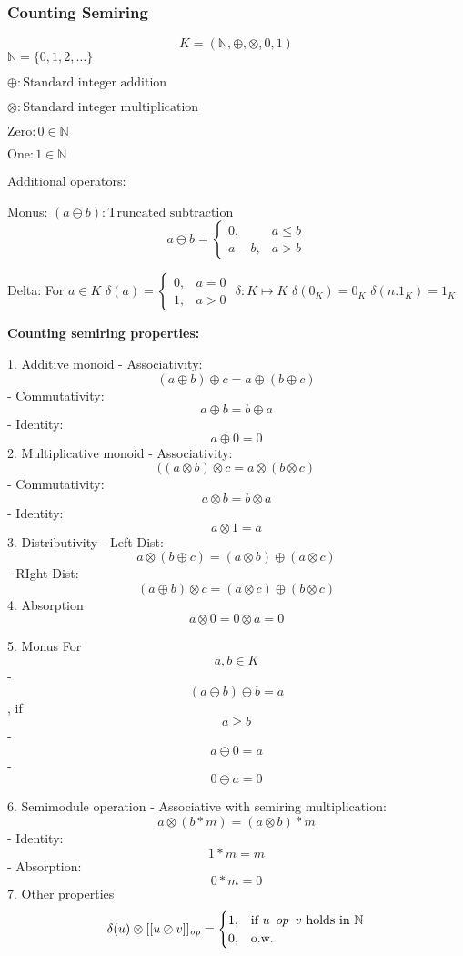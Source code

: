 \documentclass[twocolumn]{article}
\begin{document}
\subsubsection{Counting Semiring}
$$K = (\mathbb{N}, \oplus, \otimes, 0, 1)$$
$\mathbb{N} = \{0,1,2,\dots\}$

$\oplus : \text{Standard integer addition}$

$\otimes : \text{Standard integer multiplication}$

$\text{Zero} : 0 \in \mathbb{N}$

$\text{One} : 1 \in \mathbb{N}$

Additional operators:

Monus: $(a \ominus b): \text{Truncated subtraction}$
$$ a \ominus b = \begin{cases} 0, &  a\leq b\\ a-b,& a>b \end{cases}$$

Delta: 
For $a \in K$
$\delta(a) = \begin{cases} 0, & a=0\\ 1, & a>0 \end{cases}$
$\delta:K \mapsto K $
$\delta(0_K)=0_K$
$\delta(n.1_K)=1_K$


\textbf{Counting semiring properties:}

1. Additive monoid
- Associativity: $$(a \oplus b) \oplus c = a \oplus (b\oplus c)$$
- Commutativity: $$a \oplus b = b \oplus a$$
- Identity: $$a \oplus 0 = 0$$
2. Multiplicative monoid
- Associativity: $$( (a \otimes b) \otimes c = a \otimes (b\otimes c)$$
- Commutativity: $$a \otimes b = b \otimes a$$
- Identity: $$a \otimes 1 = a$$
3. Distributivity
- Left Dist: $$a \otimes (b \oplus c)= (a \otimes b)\oplus(a \otimes c)$$
- RIght Dist: $$(a \oplus b)\otimes c=(a \otimes c)\oplus(b \otimes c)$$
 4. Absorption
$$a \otimes 0 = 0 \otimes a = 0$$

5. Monus \newline
For $$a, b \in K$$
- $$(a \ominus b) \oplus b =a$$, if $$a \geq b$$
- $$a \ominus 0 =a$$
- $$0 \ominus a = 0$$

6. Semimodule operation
- Associative with semiring multiplication: $$a \otimes (b * m)= (a \otimes b) * m$$
- Identity: $$1*m=m$$
- Absorption: $$0*m=0$$
7. Other properties
$$
 \delta(u)\otimes[[u \oslash   v]]_{\mathit{op}}=\begin{cases}1, & \text{if } u\hspace{0.5em} op\hspace{0.5em} v \text{ holds in } \mathbb{N} \\
0,&\text{o.w.}\end{cases}
$$
\end{document}
